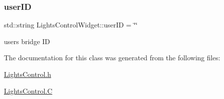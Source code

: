 \subsubsection{\texorpdfstring{user\+ID}{userID}}
{\footnotesize\ttfamily std\+::string Lights\+Control\+Widget\+::user\+ID = \char`\"{}\char`\"{}\hspace{0.3cm}{\ttfamily [private]}}

user\textquotesingle{}s bridge ID 

The documentation for this class was generated from the following files\+:\begin{DoxyCompactItemize}
\item 
\hyperlink{_lights_control_8h}{Lights\+Control.\+h}\item 
\hyperlink{_lights_control_8_c}{Lights\+Control.\+C}\end{DoxyCompactItemize}
